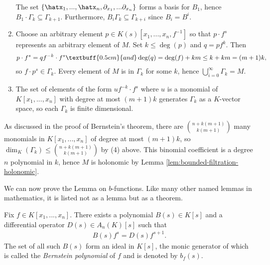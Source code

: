 \begin{prf}
\begin{enumerate}[(1)]
			The set $\{\hatx_1,...,\hatx_n,\partial_{x_1},...\partial_{x_n}\}$ forms a basis for $B_1$, hence $B_1\cdot \Gamma_k \subseteq \Gamma_{k+1}$. Furthermore, $B_i\Gamma_{k} \subseteq \Gamma_{k+i}$ since $B_i = B^i$.
		\item Choose an arbitrary element $p \in K(s)[x_1,...,x_n,f^{-1}]$ so that $p\cdot f^s$ represents an arbitrary element of $M$. Set $k\leq \deg(p)$ and $q = pf^k$. Then
			\begin{align*}
				p\cdot f^s = qf^{-k}\cdot f^s \textbuff{0.5em}{and} \deg(q) = \deg(f) + km \leq k+km = (m+1)k,
			\end{align*}
			so $f\cdot p^s \in \Gamma_k$. Every element of $M$ is in $\Gamma_k$ for some $k$, hence $\bigcup_{i=0}^\infty \Gamma_k = M$.
		
		\item The set of elements of the form $uf^{-k}\cdot f^s$ where $u$ is a monomial of $K[x_1,...,x_n]$ with degree at most $(m+1)k$ generates $\Gamma_k$ as a $K$-vector space, so each $\Gamma_k$ is finite dimensional. 
	\end{enumerate}
	As discussed in the proof of Bernstein's theorem, there are $\binom{n+k(m+1)}{k(m+1)}$ many monomials in $K[x_1,...,x_n]$ of degree at most $(m+1)k$, so $\dim_K(\Gamma_k) \leq \binom{n+k(m+1)}{k(m+1)}$ by (4) above. This binomial coefficient is a degree $n$ polynomial in $k$, hence $M$ is holonomic by Lemma \ref{lem:bounded-filtration-holonomic}.
\end{prf}
We can now prove the Lemma on $b$-functions. Like many other named lemmas in mathematics, it is listed not as a lemma but as a theorem.
\begin{thm}\label{thm:b-functions-Weyl}
	Fix $f \in K[x_1,...,x_n]$. There exists a polynomial $B(s) \in K[s]$ and a differential operator $D(s)\in A_n(K)[s]$ such that
	\begin{align*}
		B(s)f^s = D(s) f^{s+1}.
	\end{align*}
	The set of all such $B(s)$ form an ideal in $K[s]$, the monic generator of which is called the \emph{Bernstein polynomial} of $f$ and is denoted by $b_f(s)$.
\end{thm}
